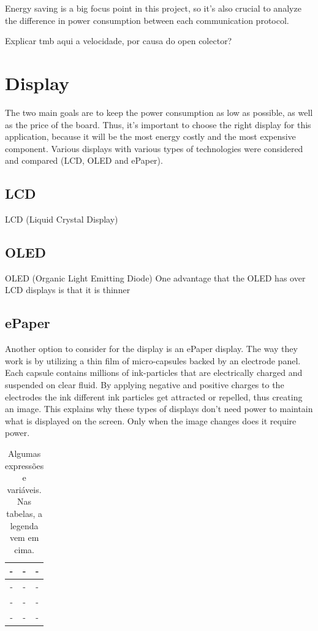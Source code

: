 \documentclass[english]{ist-thesis}
\begin{document}
Energy saving is a big focus point in this project, so it's also crucial to analyze the difference in power consumption between each communication protocol.

Explicar tmb aqui a velocidade, por causa do open colector?

\section{Display}

The two main goals are to keep the power consumption as low as possible, as well as the price of the board. Thus, it's important to choose the right display for this application, because it will be the most energy costly and the most expensive component. Various displays with various types of technologies were considered and compared (LCD, OLED and ePaper). 

\subsection{LCD}
LCD (Liquid Crystal Display) 

\subsection{OLED}
OLED (Organic Light Emitting Diode)
One advantage that the OLED has over LCD displays is that it is thinner

\subsection{ePaper}
Another option to consider for the display is an ePaper display. 
The way they work is by utilizing a thin film of micro-capsules backed by an electrode panel. Each capsule contains millions of ink-particles that are electrically charged and suspended on clear fluid. By applying negative and positive charges to the electrodes the ink different ink particles get attracted or repelled, thus creating an image. This explains why these types of displays don't need power to maintain what is displayed on the screen. Only when the image changes does it require power. 

\begin{table}[ht]
	\centering                 
	\caption{Algumas expressões e variáveis. Nas tabelas, a legenda vem em cima.}
	\begin{tabular}{| c | c | c |}
            \hline
		- & - & - \\
		\hline
		- & - & - \\
		\hline
		- & - & - \\
		\hline
		- & - & - \\
		\hline
	\end{tabular}
	\label{tab:displays}
\end{table}
\end{document}
